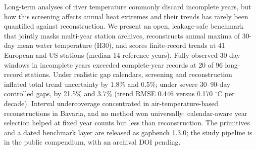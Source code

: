 Long-term analyses of river temperature commonly discard incomplete years, but how this screening affects annual heat extremes and their trends has rarely been quantified against reconstruction. We present an open, leakage-safe benchmark that jointly masks multi-year station archives, reconstructs annual maxima of 30-day mean water temperature (H30), and scores finite-record trends at 41 European and US stations (median 14 reference years). Fully observed 30-day windows in incomplete years exceeded complete-year records at 20 of 96 long-record stations. Under realistic gap calendars, screening and reconstruction inflated total trend uncertainty by 1.8\% and 0.5\%; under severe 30--90-day controlled gaps, by 21.5\% and 3.7\% (trend RMSE 0.446 versus 0.170 $^{\circ}$C per decade). Interval undercoverage concentrated in air-temperature-based reconstructions in Bavaria, and no method won universally: calendar-aware year selection helped at fixed year counts but less than reconstruction. The primitives and a dated benchmark layer are released as gapbench 1.3.0; the study pipeline is in the public compendium, with an archival DOI pending.

